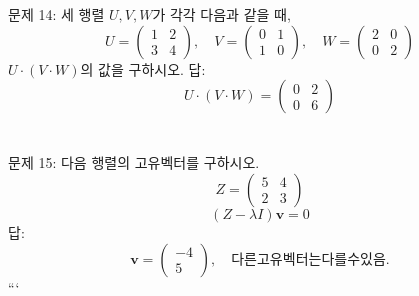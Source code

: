 \documentclass[fleqn]{article}
\begin{document}
\noindent 문제 14: 세 행렬 \(U, V, W\)가 각각 다음과 같을 때,
\[
U = \begin{pmatrix}
1 & 2 \\
3 & 4 
\end{pmatrix}, \quad V = \begin{pmatrix}
0 & 1 \\
1 & 0 
\end{pmatrix}, \quad W = \begin{pmatrix}
2 & 0 \\
0 & 2 
\end{pmatrix}
\]
\(U \cdot (V \cdot W)\)의 값을 구하시오. \noindent 답: \\
\[
U \cdot (V \cdot W) = \begin{pmatrix}
0 & 2 \\
0 & 6 
\end{pmatrix}
\] \\\\

\noindent 문제 15: 다음 행렬의 고유벡터를 구하시오.
\[
Z = \begin{pmatrix}
5 & 4 \\
2 & 3 
\end{pmatrix}
\] 
\[
(Z - \lambda I)\mathbf{v} = 0
\] \noindent 답: \\
\[
\mathbf{v} = \begin{pmatrix}
-4 \\
5 
\end{pmatrix}, \quad 다른 고유벡터는 다를 수 있음.
\]
```
      
        
\end{document}
